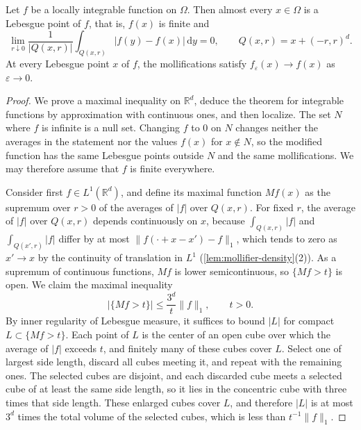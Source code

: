 \begin{theorem}\label{thm:lebesgue-differentiation}
Let $f$ be a locally integrable function on $\Omega$. Then almost every $x\in\Omega$ is a Lebesgue point of $f$, that is, $f(x)$ is finite and
\[
 \lim_{r\downarrow0}\frac1{|Q(x,r)|}
        \int_{Q(x,r)}|f(y)-f(x)|\,\mathrm dy=0,
 \qquad Q(x,r)=x+(-r,r)^d.
\]
At every Lebesgue point $x$ of $f$, the mollifications satisfy $f_\varepsilon(x)\to f(x)$ as $\varepsilon\to0$.
\end{theorem}
\begin{proof}
We prove a maximal inequality on $\mathbb R^d$, deduce the theorem for integrable functions by approximation with continuous ones, and then localize. The set $N$ where $f$ is infinite is a null set. Changing $f$ to $0$ on $N$ changes neither the averages in the statement nor the values $f(x)$ for $x\notin N$, so the modified function has the same Lebesgue points outside $N$ and the same mollifications. We may therefore assume that $f$ is finite everywhere.

Consider first $f\in L^1(\mathbb R^d)$, and define its maximal function $Mf(x)$ as the supremum over $r>0$ of the averages of $|f|$ over $Q(x,r)$. For fixed $r$, the average of $|f|$ over $Q(x,r)$ depends continuously on $x$, because $\int_{Q(x,r)}|f|$ and $\int_{Q(x',r)}|f|$ differ by at most $\|f(\cdot+x-x')-f\|_1$, which tends to zero as $x'\to x$ by the continuity of translation in $L^1$ (\cref{lem:mollifier-density}(2)). As a supremum of continuous functions, $Mf$ is lower semicontinuous, so $\{Mf>t\}$ is open. We claim the maximal inequality
\[
 |\{Mf>t\}|\le\frac{3^d}{t}\|f\|_1,\qquad t>0.
\]
By inner regularity of Lebesgue measure, it suffices to bound $|L|$ for compact $L\subset\{Mf>t\}$. Each point of $L$ is the center of an open cube over which the average of $|f|$ exceeds $t$, and finitely many of these cubes cover $L$. Select one of largest side length, discard all cubes meeting it, and repeat with the remaining ones. The selected cubes are disjoint, and each discarded cube meets a selected cube of at least the same side length, so it lies in the concentric cube with three times that side length. These enlarged cubes cover $L$, and therefore $|L|$ is at most $3^d$ times the total volume of the selected cubes, which is less than $t^{-1}\|f\|_1$.


\end{proof}
